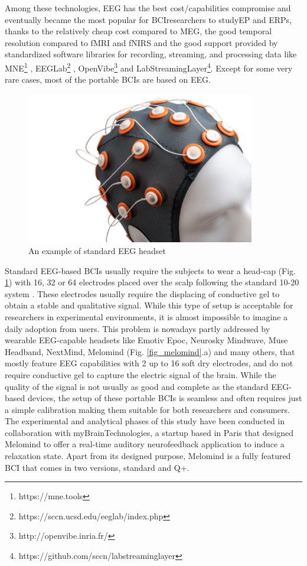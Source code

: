 Among these technologies, \ac{EEG} has the best cost/capabilities compromise and eventually became the most popular for \ac{BCI}researchers to study\ac{EP} and \ac{ERPs}, thanks to the relatively cheap cost compared to \ac{MEG}, the good temporal resolution compared to \ac{fMRI} and \ac{fNIRS} and the good support provided by standardized software libraries for recording, streaming, and processing data like MNE\footnote{https://mne.tools} , EEGLab\footnote{https://sccn.ucsd.edu/eeglab/index.php} , OpenVibe\footnote{http://openvibe.inria.fr/}  and LabStreamingLayer\footnote{https://github.com/sccn/labstreaminglayer}. Except for some very rare cases, most of the portable \ac{BCIs} are based on \ac{EEG}.

\begin{figure}[h]
\includegraphics[width=10cm]{img/background/eeg_headcap.png}
\centering
\caption{An example of standard EEG headset}\label{fig_eeg_headcap}
\end{figure}

Standard EEG-based \ac{BCIs} usually require the subjects to wear a head-cap (Fig. \ref{fig_eeg_headcap}) with 16, 32 or 64 electrodes placed over the scalp following the standard 10-20 system . These electrodes usually require the displacing of conductive gel to obtain a stable and qualitative signal. While this type of setup is acceptable for researchers in experimental environments, it is almost impossible to imagine a daily adoption from users. This problem is nowadays partly addressed by wearable EEG-capable headsets like Emotiv Epoc, Neurosky Mindwave, Muse Headband, NextMind, Melomind (Fig. \ref{fig_melomind}.a) and many others, that mostly feature EEG capabilities with 2 up to 16 soft dry electrodes, and do not require conductive gel to capture the electric signal of the brain. While the quality of the signal is not usually as good and complete as the standard EEG-based devices, the setup of these portable \ac{BCIs} is seamless and often requires just a simple calibration making them suitable for both researchers and consumers. The experimental and analytical phases of this study have been conducted in collaboration with myBrainTechnologies, a startup based in Paris that designed Melomind to offer a real-time auditory neurofeedback application to induce a relaxation state. Apart from its designed purpose, Melomind is a fully featured \ac{BCI} that comes in two versions, standard and Q+. 

